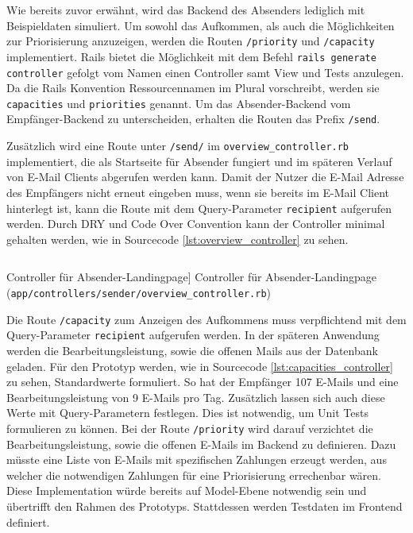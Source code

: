 Wie bereits zuvor erwähnt, wird das Backend des Absenders lediglich mit Beispieldaten simuliert. Um sowohl das Aufkommen, als auch die Möglichkeiten zur Priorisierung anzuzeigen, werden die Routen \texttt{/priority} und \texttt{/capacity} implementiert. Rails bietet die Möglichkeit mit dem Befehl \texttt{rails generate controller} gefolgt vom Namen einen Controller samt View und Tests anzulegen. Da die Rails Konvention Ressourcennamen im Plural vorschreibt, werden sie \texttt{capacities} und \texttt{priorities} genannt. Um das Absender-Backend vom Empfänger-Backend zu unterscheiden, erhalten die Routen das Prefix \texttt{/send}. 

Zusätzlich wird eine Route unter \texttt{/send/} im \texttt{overview\_controller.rb} implementiert, die als Startseite für Absender fungiert und im späteren Verlauf von E-Mail Clients abgerufen werden kann. Damit der Nutzer die E-Mail Adresse des Empfängers nicht erneut eingeben muss, wenn sie bereits im E-Mail Client hinterlegt ist, kann die Route mit dem Query-Parameter \texttt{recipient} aufgerufen werden. Durch DRY und Code Over Convention kann der Controller minimal gehalten werden, wie in Sourcecode \ref{lst:overview_controller} zu sehen.

\begin{listing}[!ht]
\inputminted[linenos]{ruby}{Listings/Prototype/overview_controller.rb}

\caption
    [Controller für Absender-Landingpage]
    {Controller für Absender-Landingpage (\texttt{app/controllers/sender/overview\_controller.rb})}
    
\label{lst:overview_controller}
\end{listing}

\noindent Die Route \texttt{/capacity} zum Anzeigen des Aufkommens muss verpflichtend mit dem Query-Parameter \texttt{recipient} aufgerufen werden. In der späteren Anwendung werden die Bearbeitungsleistung, sowie die offenen Mails aus der Datenbank geladen. Für den Prototyp werden, wie in Sourcecode \ref{lst:capacities_controller} zu sehen, Standardwerte formuliert. So hat der Empfänger 107 E-Mails und eine Bearbeitungsleistung von 9 E-Mails pro Tag. Zusätzlich lassen sich auch diese Werte mit Query-Parametern festlegen. Dies ist notwendig, um Unit Tests formulieren zu können. Bei der Route \texttt{/priority} wird darauf verzichtet die Bearbeitungsleistung, sowie die offenen E-Mails im Backend zu definieren. Dazu müsste eine Liste von E-Mails mit spezifischen Zahlungen erzeugt werden, aus welcher die notwendigen Zahlungen für eine Priorisierung errechenbar wären. Diese Implementation würde bereits auf Model-Ebene notwendig sein und übertrifft den Rahmen des Prototyps. Stattdessen werden Testdaten im Frontend definiert.  

